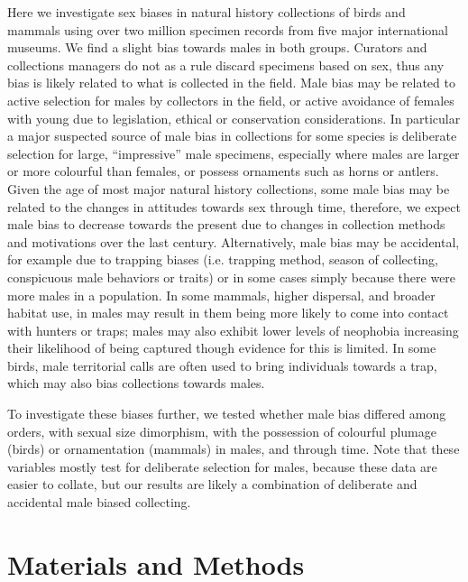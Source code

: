 \documentclass[a4paper, 12pt]{article}
\begin{document}
Here we investigate sex biases in natural history collections of birds and mammals using over two million specimen records from five major international museums.
We find a slight bias towards males in both groups.
Curators and collections managers do not as a rule discard specimens based on sex, thus any bias is likely related to what is collected in the field. 
Male bias may be related to active selection for males by collectors in the field, or active avoidance of females with young due to legislation, ethical or conservation considerations. 
In particular a major suspected source of male bias in collections for some species is deliberate selection for large, ``impressive'' male specimens, especially where males are larger or more colourful than females, or possess ornaments such as horns or antlers.
Given the age of most major natural history collections, some male bias may be related to the changes in attitudes towards sex through time, therefore, we expect male bias to decrease towards the present due to changes in collection methods and motivations over the last century. 
Alternatively, male bias may be accidental, for example due to trapping biases (i.e. trapping method, season of collecting, conspicuous male behaviors or traits) or in some cases simply because there were more males in a population. 
In some mammals, higher dispersal, and broader habitat use, in males may result in them being more likely to come into contact with hunters or traps; males may also exhibit lower levels of neophobia increasing their likelihood of being captured though evidence for this is limited\cite{crane2017patterns,laviola1992sexual}. 
In some birds, male territorial calls are often used to bring individuals towards a trap, which may also bias collections towards males.

To investigate these biases further, we tested whether male bias differed among orders, with sexual size dimorphism, with the possession of colourful plumage (birds) or ornamentation (mammals) in males, and through time. 
Note that these variables mostly test for deliberate selection for males, because these data are easier to collate, but our results are likely a combination of deliberate and accidental male biased collecting.

\newpage
\begin{landscape}
  
\end{landscape}

\section{Materials and Methods}
\end{document}
